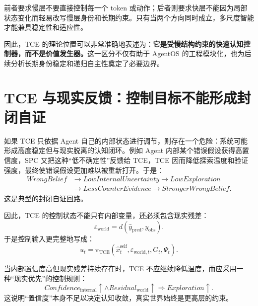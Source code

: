 前者要求慢层不要直接控制每一个 token 或动作；后者则要求快层不能因为局部状态变化而轻易改写慢层身份和长期约束。只有当两个方向同时成立，多尺度智能才能兼具稳定性和适应性。

因此，TCE 的理论位置可以非常准确地表述为：\textbf{它是受慢结构约束的快速认知控制器，而不是价值发生器。}这一区分不仅有助于 AgentOS 的工程模块化，也为后续分析长期身份稳定和递归自主性奠定了必要边界。

\section{TCE 与现实反馈：控制目标不能形成封闭自证}

如果 TCE 只依据 Agent 自己的内部状态进行调节，则存在一个危险：系统可能形成高度稳定但与现实脱离的认知闭环。例如 Agent 内部某个错误假设获得高置信度，SPC 又把这种“低不确定性”反馈给 TCE，TCE 因而降低探索温度和验证强度，最终使错误假设更加难以被重新打开。于是：
\begin{equation}
    \begin{aligned}
    WrongBelief&\rightarrow LowInternalUncertainty\rightarrow LowExploration\\
    &\rightarrow LessCounterEvidence\rightarrow StrongerWrongBelief.
    \end{aligned}
\end{equation}
这是典型的封闭自证回路。

因此，TCE 的控制状态不能只有内部变量，还必须包含现实残差：
\begin{equation}
    \varepsilon_{\mathrm{world}}
    =
    d(
    \hat y_{\mathrm{pred}},
    y_{\mathrm{obs}}
    ).
\end{equation}
于是控制输入更完整地写成：
\begin{equation}
    u_t
    =
    \pi_{\mathrm{TCE}}
    \left(
    \hat x^{\mathrm{self}}_t,
    \varepsilon_{\mathrm{world},t},
    G_t,
    \Psi_t
    \right).
\end{equation}

当内部置信度高但现实残差持续存在时，TCE 不应继续降低温度，而应采用一种“现实优先”的控制规则：
\begin{equation}
    Confidence_{\mathrm{internal}}\uparrow
    \land
    Residual_{\mathrm{world}}\uparrow
    \Rightarrow
    Exploration\uparrow.
\end{equation}
这说明“置信度”本身不足以决定认知收敛，真实世界始终是更高层的约束。

